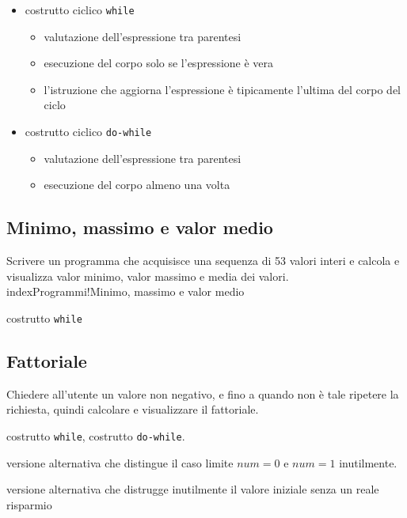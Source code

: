 \begin{itemize}
\item costrutto ciclico \texttt{while}
    \begin{itemize}
    \item valutazione dell'espressione tra parentesi
    \item esecuzione del corpo solo se l'espressione \`e vera
    \item l'istruzione che aggiorna l'espressione  \`e tipicamente l'ultima del corpo del ciclo
    \end{itemize}
\item costrutto ciclico \texttt{do-while}
    \begin{itemize}
    \item valutazione dell'espressione tra parentesi
    \item esecuzione del corpo almeno una volta 
    \end{itemize}
\end{itemize}

\mysep{}

\subsection{Minimo, massimo e valor medio}
Scrivere un programma che acquisisce una sequenza di 53 valori interi e calcola e visualizza valor minimo, valor massimo e media dei valori.\\index{Programmi!Minimo, massimo e valor medio} 

\begin{tags}
costrutto \texttt{while}
\end{tags}


\subsection{Fattoriale}
Chiedere all'utente un valore non negativo, e fino a quando non \`e tale ripetere la richiesta, quindi calcolare e visualizzare il fattoriale.

\begin{tags}
costrutto \texttt{while}, costrutto \texttt{do-while}.
\end{tags}


versione alternativa che distingue il caso limite $num=0$ e $num=1$ inutilmente.


versione alternativa che distrugge inutilmente il valore iniziale senza un reale risparmio


